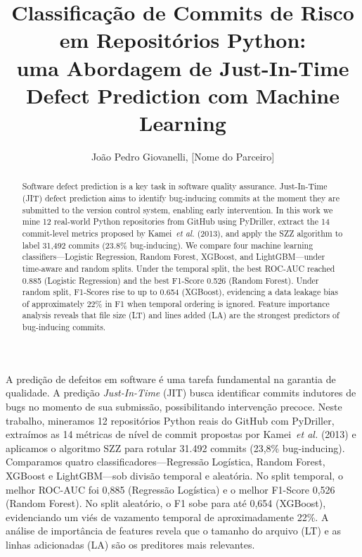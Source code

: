 \documentclass[12pt]{article}
\title{Classificação de Commits de Risco em Repositórios Python:\\
       uma Abordagem de Just-In-Time Defect Prediction com Machine Learning}
\author{João Pedro Giovanelli\inst{1}, [Nome do Parceiro]\inst{1}}
\begin{document}
\maketitle

\begin{abstract}
Software defect prediction is a key task in software quality assurance.
Just-In-Time (JIT) defect prediction aims to identify bug-inducing commits
at the moment they are submitted to the version control system, enabling
early intervention.
In this work we mine 12 real-world Python repositories from GitHub using
PyDriller, extract the 14 commit-level metrics proposed by Kamei~\textit{et al.}
(2013), and apply the SZZ algorithm to label 31,492 commits (23.8\% bug-inducing).
We compare four machine learning classifiers---Logistic Regression, Random
Forest, XGBoost, and LightGBM---under time-aware and random splits.
Under the temporal split, the best ROC-AUC reached 0.885 (Logistic Regression)
and the best F1-Score 0.526 (Random Forest).
Under random split, F1-Scores rise to up to 0.654 (XGBoost), evidencing
a data leakage bias of approximately 22\% in F1 when temporal ordering is ignored.
Feature importance analysis reveals that file size (LT) and lines added (LA) are
the strongest predictors of bug-inducing commits.
\end{abstract}

\begin{resumo}
A predição de defeitos em software é uma tarefa fundamental na garantia de qualidade.
A predição \textit{Just-In-Time} (JIT) busca identificar commits indutores de bugs
no momento de sua submissão, possibilitando intervenção precoce.
Neste trabalho, mineramos 12 repositórios Python reais do GitHub com PyDriller,
extraímos as 14 métricas de nível de commit propostas por Kamei~\textit{et al.}
(2013) e aplicamos o algoritmo SZZ para rotular 31.492 commits (23,8\% bug-inducing).
Comparamos quatro classificadores---Regressão Logística, Random Forest, XGBoost e
LightGBM---sob divisão temporal e aleatória.
No split temporal, o melhor ROC-AUC foi 0,885 (Regressão Logística) e o melhor
F1-Score 0,526 (Random Forest). No split aleatório, o F1 sobe para até 0,654
(XGBoost), evidenciando um viés de vazamento temporal de aproximadamente 22\%.
A análise de importância de features revela que o tamanho do arquivo (LT)
e as linhas adicionadas (LA) são os preditores mais relevantes.
\end{resumo}
\end{document}
